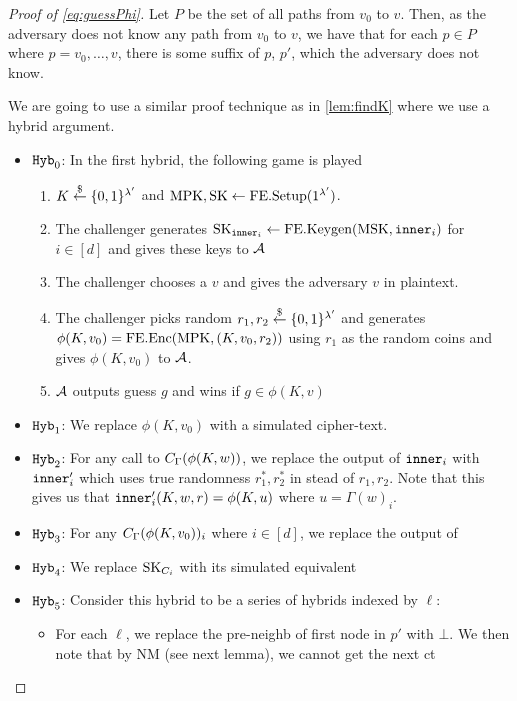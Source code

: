 \begin{proof}[Proof of \cref{eq:guessPhi}]
	Let $P$ be the set of all paths from $v_0$ to $v$. Then, as the adversary does not know any path from $v_0$ to $v$,
	we have that for each $p \in P$ where $p = v_0, \dots, v$, there is some suffix of $p$, $p'$, which the adversary does not know.

	We are going to use a similar proof technique as in \cref{lem:findK} where we use a hybrid argument.
	\begin{itemize}
		\item $\texttt{Hyb}_0$: In the first hybrid, the following game is played
			\begin{enumerate}
				\item $K \overset{\$}{\gets} \{0,1\}^{\lambda'}$ and $\text{MPK}, \text{SK} \gets \text{FE.Setup}(1^{\lambda'})$.
				\item The challenger generates $\text{SK}_{\texttt{inner}_i} \gets \text{FE.Keygen}(\text{MSK}, \texttt{inner}_i)$ for $i \in [d]$ and gives these keys to $\mathcal{A}$
				\item The challenger chooses a $v$ and gives the adversary $v$ in plaintext.
				\item The challenger picks random $r_1, r_2 \overset{\$}{\gets} \{0,1\}^{\lambda'}$ and generates $\phi(K, v_0) = \text{FE.Enc}(\text{MPK}, (K, v_0, r_2))$ using $r_1$ as the random coins and gives $\phi(K, v_0)$ to $\mathcal{A}$.
				\item $\mathcal{A}$ outputs guess $g$ and wins if $g \in \phi(K, v)$
			\end{enumerate}
		\item $\texttt{Hyb}_1$: We replace $\phi(K, v_0)$ with a simulated cipher-text.
		\item $\texttt{Hyb}_2$: For any call to $C_\Gamma(\phi(K, w))$,
		we replace the output of $\texttt{inner}_i$ with $\texttt{inner}_i'$ which uses true randomness $r_1^*, r_2^*$ in stead of $r_1, r_2$.
		Note that this gives us that $\texttt{inner}_i'(K, w, r) = \phi(K, u)$ where $u = \Gamma(w)_i$.
		\item $\texttt{Hyb}_3$: For any $C_\Gamma(\phi(K, v_0))_i$ where $i \in [d]$, we replace the output of
		\item $\texttt{Hyb}_4$: We replace $\text{SK}_{C_i}$ with its simulated equivalent
		\item $\texttt{Hyb}_5$: Consider this hybrid to be a series of hybrids indexed by $\ell$:
		\begin{itemize}
			\item For each $\ell$, we replace the pre-neighb of first node in $p'$ with $\bot$. We then note that by NM (see next lemma), we cannot get the next ct

\end{itemize}
\end{itemize}
\end{proof}
